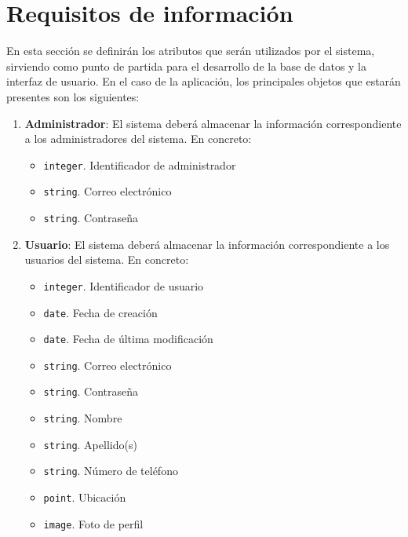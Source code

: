 
\section{Requisitos de información}\label{sec:requisitos-informacion}

En esta sección se definirán los atributos que serán utilizados por el sistema, sirviendo como punto de partida para el desarrollo de la base de datos y la interfaz de usuario. En el caso de la aplicación, los principales objetos que estarán presentes son los siguientes:

\begin{enumerate}[label=IRQ-\protect\twodigits{\arabic*}:, align=left, leftmargin=*]	

    \item \textbf{Administrador}: El sistema deberá almacenar la información correspondiente a los administradores del sistema. En concreto:
    \begin{itemize}
        \item \texttt{integer}. Identificador de administrador
        \item \texttt{string}. Correo electrónico
        \item \texttt{string}. Contraseña
    \end{itemize}
    
    \item \textbf{Usuario}: El sistema deberá almacenar la información correspondiente a los usuarios del sistema. En concreto:
    \begin{itemize}
		\item \texttt{integer}. Identificador de usuario
        \item \texttt{date}. Fecha de creación
        \item \texttt{date}. Fecha de última modificación
        \item \texttt{string}. Correo electrónico
		\item \texttt{string}. Contraseña
        \item \texttt{string}. Nombre
        \item \texttt{string}. Apellido(s)
		\item \texttt{string}. Número de teléfono
		\item \texttt{point}. Ubicación
		\item \texttt{image}. Foto de perfil
    \end{itemize}


\end{enumerate}
